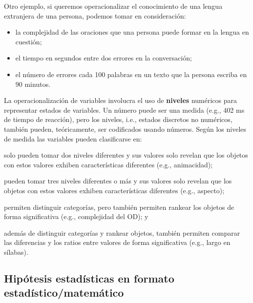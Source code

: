 \documentclass[12pt,spanish,a4paper,]{article}
\providecommand{\tightlist}{%
  \setlength{\itemsep}{0pt}\setlength{\parskip}{0pt}}
\begin{document}
Otro ejemplo, si queremos operacionalizar el conocimiento de una lengua
extranjera de una persona, podemos tomar en consideración:

\begin{itemize}
\tightlist
\item
  la complejidad de las oraciones que una persona puede formar en la
  lengua en cuestión;
\item
  el tiempo en segundos entre dos errores en la conversación;
\item
  el número de errores cada 100 palabras en un texto que la persona
  escriba en 90 minutos.
\end{itemize}

La operacionalización de variables involucra el uso de \textbf{niveles}
numéricos para representar estados de variables. Un número puede ser una
medida (e.g., 402 ms de tiempo de reacción), pero los niveles, i.e.,
estados discretos no numéricos, también pueden, teóricamente, ser
codificados usando números. Según los niveles de medida las variables
pueden clasificarse en:

\begin{description}
\tightlist
\item[variable nominal (o binaria)]
solo pueden tomar dos niveles diferentes y sus valores solo revelan que
los objetos con estos valores exhiben características diferentes (e.g.,
animacidad);
\item[variable categórica]
pueden tomar tres niveles diferentes o más y sus valores solo revelan
que los objetos con estos valores exhiben características diferentes
(e.g., aspecto);
\item[variable ordinal]
permiten distinguir categorías, pero también permiten rankear los
objetos de forma significativa (e.g., complejidad del OD); y
\item[variable cuantitativa (o de razón)]
además de distinguir categorías y rankear objetos, también permiten
comparar las diferencias y los ratios entre valores de forma
significativa (e.g., largo en sílabas).
\end{description}

\hypertarget{hipotesis-estadisticas-en-formato-estadisticomatematico}{%
\subsection{Hipótesis estadísticas en formato
estadístico/matemático}\label{hipotesis-estadisticas-en-formato-estadisticomatematico}}
\end{document}
